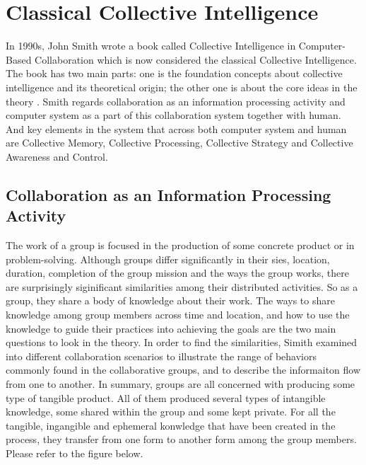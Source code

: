 \section{Classical Collective Intelligence}
In 1990s, John Smith wrote a book called Collective Intelligence in Computer-Based Collaboration which is now considered the classical Collective Intelligence. The book has two main parts: one is the foundation concepts about collective intelligence and its theoretical origin; the other one is about the core ideas in the theory \cite{cibook}. Smith regards collaboration as an information processing activity and computer system as a part of this collaboration system together with human. And key elements in the system that across both computer system and human are Collective Memory, Collective Processing, Collective Strategy and Collective Awareness and Control.

\subsection{Collaboration as an Information Processing Activity}
The work of a group is focused in the production of some concrete product or in problem-solving. Although groups differ significantly in their sies, location, duration, completion of the group mission and the ways the group works, there are surprisingly siginificant similarities among their distributed activities. So as a group, they share a body of knowledge about their work. The ways to share knowledge among group members across time and location, and how to use the knowledge to guide their practices into achieving the goals are the two main questions to look in the theory. In order to find the similarities, Simith examined into different collaboration scenarios to illustrate the range of behaviors commonly found in the collaborative groups, and to describe the informaiton flow from one to another. In summary, groups are all concerned with producing some type of tangible product. All of them produced several types of intangible knowledge, some shared within the group and some kept private. For all the tangible, ingangible and ephemeral konwledge that have been created in the process, they transfer from one form to another form among the group members. Please refer to the figure below.

